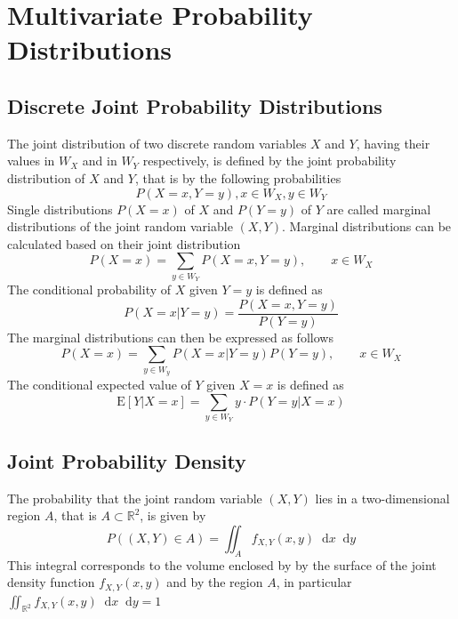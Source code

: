 \documentclass[11pt]{article}
\newcommand*\ev[1]{\mathrel{\text{E}\left[#1\right]}}
\newcommand*\R{\mathbb{R}}
\newcommand*\diff{\mathop{}\!\mathrm{d}}
\begin{document}
\newpage
\newpage
\section{Multivariate Probability Distributions}

\subsection{Discrete Joint Probability Distributions}
The joint distribution of two discrete random variables $X$ and $Y$, having their values in $W_X$ and in $W_Y$ respectively, is defined by the joint probability distribution of $X$ and $Y$, that is by the following probabilities
\begin{equation*}
	P(X=x, Y=y), x\in W_X, y\in W_Y
\end{equation*}
Single distributions $P(X = x)$ of $X$ and $P(Y = y)$ of $Y$ are called marginal distributions of the joint random variable $(X,Y)$. Marginal distributions can be calculated based on their joint distribution
\begin{equation*}
	P(X=x) = \sum_{y\in W_Y} P(X = x, Y = y),\qquad x\in W_X
\end{equation*}
The conditional probability of $X$ given $Y=y$ is defined as
\begin{equation*}
	P(X = x | Y = y) = \frac{P(X = x, Y = y)}{P(Y=y)}
\end{equation*}
The marginal distributions can then be expressed as follows
\begin{equation*}
	P(X=x) = \sum_{y\in W_y} P(X=x|Y=y)P(Y=y),\qquad x\in W_X
\end{equation*}
The conditional expected value of $Y$ given $X=x$ is defined as
\begin{equation*}
	\ev{Y|X=x} = \sum_{y\in W_Y} y\cdot P(Y=y|X=x)
\end{equation*}

\subsection{Joint Probability Density}
The probability that the joint random variable $(X,Y)$ lies in a two-dimensional region $A$, that is $A\subset \R^2$, is given by
\begin{equation*}
	P\left( (X,Y) \in A \right) = \iint_{A} f_{X,Y}(x,y) \diff x \diff y
\end{equation*}
This integral corresponds to the volume enclosed by by the surface of the joint density function $f_{X,Y}(x,y)$ and by the region $A$, in particular $\iint_{\R^2} f_{X,Y}(x,y) \diff x\diff y = 1$
\end{document}
